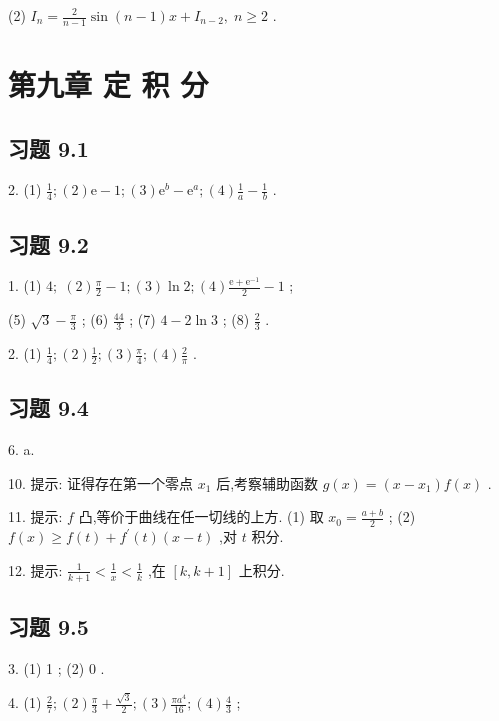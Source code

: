 (2) \({I}_{n} = \frac{2}{n - 1}\sin \left( {n - 1}\right) x + {I}_{n - 2},\;n \geq  2\) .

\section{第九章 定 积 分}

\subsection{习题 9.1}

2. (1) \(\frac{1}{4};\left( 2\right) \mathrm{e} - 1;\left( 3\right) {\mathrm{e}}^{b} - {\mathrm{e}}^{a};\left( 4\right) \frac{1}{a} - \frac{1}{b}\) .

\subsection{习题 9.2}

1. (1) \(4;\;\left( 2\right) \frac{\pi }{2} - 1;\left( 3\right) \ln 2;\left( 4\right) \frac{\mathrm{e} + {\mathrm{e}}^{-1}}{2} - 1\) ;

(5) \(\sqrt{3} - \frac{\pi }{3}\) ; (6) \(\frac{44}{3}\) ; (7) \(4 - 2\ln 3\) ; (8) \(\frac{2}{3}\) .

2. (1) \(\frac{1}{4};\left( 2\right) \frac{1}{2};\left( 3\right) \frac{\pi }{4};\left( 4\right) \frac{2}{\pi }\) .

\subsection{习题 9.4}

6. a.

10. 提示: 证得存在第一个零点 \({x}_{1}\) 后,考察辅助函数 \(g\left( x\right)  = \left( {x - {x}_{1}}\right) f\left( x\right)\) .

11. 提示: \(f\) 凸,等价于曲线在任一切线的上方. (1) 取 \({x}_{0} = \frac{a + b}{2}\) ; (2) \(f\left( x\right)  \geq  f\left( t\right)  + {f}^{\prime }\left( t\right) \left( {x - t}\right)\) ,对 \(t\) 积分.

12. 提示: \(\frac{1}{k + 1} < \frac{1}{x} < \frac{1}{k}\) ,在 \(\left\lbrack  {k,k + 1}\right\rbrack\) 上积分.

\subsection{习题 9.5}

3. (1) 1 ; (2) 0 .

4. (1) \(\frac{2}{7};\left( 2\right) \frac{\pi }{3} + \frac{\sqrt{3}}{2};\left( 3\right) \frac{\pi {a}^{4}}{16};\left( 4\right) \frac{4}{3}\) ;

